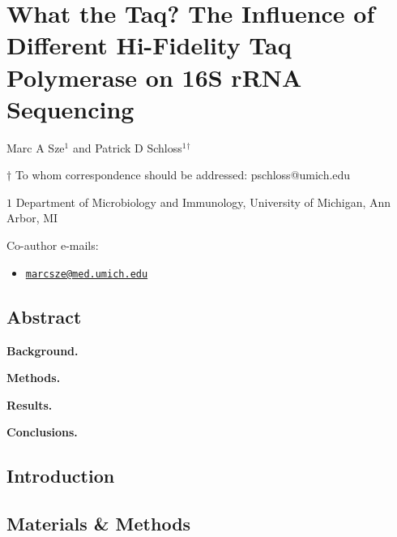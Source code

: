 \documentclass[12pt,]{article}
\title{}
\author{}
\date{}
\providecommand{\tightlist}{%
  \setlength{\itemsep}{0pt}\setlength{\parskip}{0pt}}
\begin{document}
\section{What the Taq? The Influence of Different Hi-Fidelity Taq
Polymerase on 16S rRNA
Sequencing}\label{what-the-taq-the-influence-of-different-hi-fidelity-taq-polymerase-on-16s-rrna-sequencing}

\begin{center}
\vspace{25mm}

Marc A Sze${^1}$ and Patrick D Schloss${^1}$${^\dagger}$

\vspace{20mm}

$\dagger$ To whom correspondence should be addressed: pschloss@umich.edu

$1$ Department of Microbiology and Immunology, University of Michigan, Ann Arbor, MI




\end{center}

Co-author e-mails:

\begin{itemize}
\tightlist
\item
  \href{mailto:marcsze@med.umich.edu}{\nolinkurl{marcsze@med.umich.edu}}
\end{itemize}

\newpage

\linenumbers

\subsection{Abstract}\label{abstract}

\textbf{Background.}

\textbf{Methods.}

\textbf{Results.}

\textbf{Conclusions.}

\newpage

\subsection{Introduction}\label{introduction}

\newpage

\subsection{Materials \& Methods}\label{materials-methods}
\end{document}
